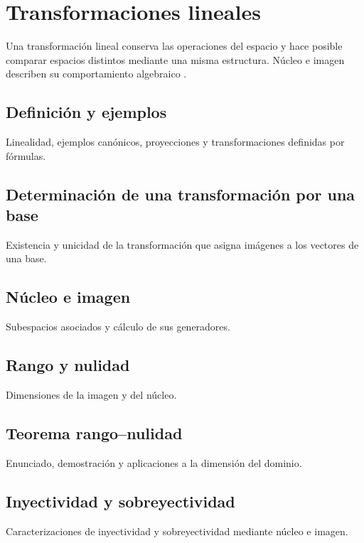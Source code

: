 \chapter{Transformaciones lineales}
\label{cap:transformaciones}

Una transformación lineal conserva las operaciones del espacio y hace posible comparar espacios distintos mediante una misma estructura. Núcleo e imagen describen su comportamiento algebraico \cite{lang1987,hoffmankunze1971,axler2024}.

\section{Definición y ejemplos}
Linealidad, ejemplos canónicos, proyecciones y transformaciones definidas por fórmulas.

\section{Determinación de una transformación por una base}
Existencia y unicidad de la transformación que asigna imágenes a los vectores de una base.

\section{Núcleo e imagen}
Subespacios asociados y cálculo de sus generadores.

\section{Rango y nulidad}
Dimensiones de la imagen y del núcleo.

\section{Teorema rango--nulidad}
Enunciado, demostración y aplicaciones a la dimensión del dominio.

\section{Inyectividad y sobreyectividad}
Caracterizaciones de inyectividad y sobreyectividad mediante núcleo e imagen.
